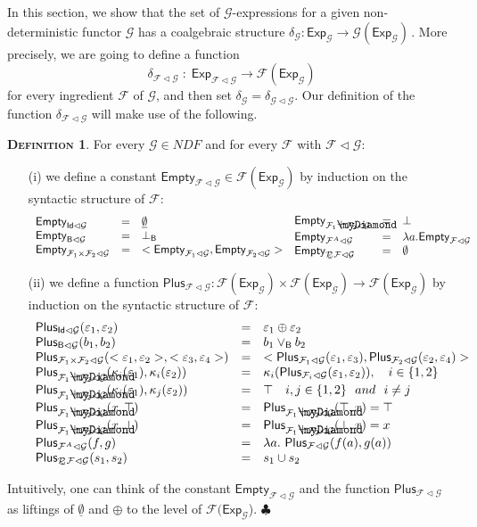 \documentclass{LMCS}
\def\pow{{\mathcal P_{\!\!\!\omega}}}
\newcommand\E\varepsilon
\newcommand\Exp{\mathsf{Exp}}
\newcommand\Plus{\mathsf{Plus}}
\newcommand\Empty{\mathsf{Empty}}
\newcommand\ndf{\mathit{NDF}}
\newcommand\id{\mathsf{Id}}
\newcommand\B{\mathsf{B}}
\newcommand\G{\mathcal{G}}
\newcommand\F{\mathcal{F}}
\newcommand\emp{\underline\emptyset}
\newcommand{\myplus}{\mathbin{\rlap{$\myDiamond$}\hspace*{.01cm}\raisebox{.14ex}{$+$}}}
\def\hyph{-\penalty0\hskip0pt\relax}
\theoremstyle{definition}
\newtheorem{mydefinition}{\textsc{Definition}}[section]
\theoremstyle{plain}
\theoremstyle{plain}
\theoremstyle{plain}
\theoremstyle{plain}
\theoremstyle{definition}
\theoremstyle{definition}
\newenvironment{definition}{
\begin{mydefinition}}
    {\hfill$\clubsuit$\end{mydefinition}}
\begin{document}
In this section, we show that the set of $\G$-expressions for a given
non\hyph deterministic functor $\G$ has a coalgebraic structure
$\delta_\G \colon
\Exp_\G\to \G(\Exp_\G)\,$. More precisely, we
are going to define a function
\[
\delta_{\F \lhd \G}\; : \; \Exp_{\F\lhd \G} \to \F (\Exp_\G)
\]
for every ingredient $\F$ of $\G$, and then set $\delta_\G =
\delta_{\G\lhd \G}$. Our definition of the
function $\delta_{\F \lhd \G}$ will make use of the following.
\begin{definition}For every $\G\in \ndf$ and for every $\F$ with
$\F\lhd \G$:
\begin{itemize} 
\item[(i)] we define a constant $\Empty_{\F\lhd \G} \in
\F(\Exp_{\G})$ by induction on the syntactic structure of $\F$:
\[
\begin{array}{lcl}
\Empty_{\id\lhd \G} &=& \emp \\
\Empty_{\B\lhd \G} &=& \bot_\B\\
\Empty_{\F_1\times \F_2\lhd \G} &=& <\Empty_{\F_1\lhd
\G}, \Empty_{\F_2\lhd \G}>
\end{array}
\begin{array}{lcl}
\Empty_{\F_1\myplus \F_2\lhd \G} &=& \bot\\
\Empty_{\F^A\lhd \G} &=& \lambda a. \Empty_{\F\lhd \G}\\
\Empty_{\pow \F\lhd \G} &=& \emptyset
\end{array}
\]
\item[(ii)] we define  a function $\Plus_{\F\lhd \G}\colon
\F(\Exp_{\G})\times
\F(\Exp_{\G})\to
\F(\Exp_\G)$ by induction on the syntactic structure of $\F$:
\[
\begin{array}{lcl}
\Plus_{\id\lhd \G} (\E_1, \E_2) &=& \E_1 \oplus \E_2\\
\Plus_{\B\lhd \G} (b_1,b_2) &=& b_1\vee_\B b_2\\
\Plus_{\F_1\times \F_2 \lhd \G} (<\E_1, \E_2>, <\E_3,
\E_4>)& =& <\Plus_{\F_1\lhd \G} (\E_1,\E_3),
\Plus_{\F_2\lhd \G} (
\E_2, \E_4)>\\
\Plus_{\F_1 \myplus \F_2\lhd \G} (\kappa_i(\E_1),\kappa_i(\E_2)) &=&
\kappa_i(\Plus_{\F_i\lhd \G} (\E_1,\E_2)),\ \ \ i\in \{1,2\}\\
\Plus_{\F_1 \myplus \F_2\lhd \G} (\kappa_i(\E_1),\kappa_j(\E_2)) &=& \top
\ \ \ i,j\in\{1,2\}\ \ and\ \ i\neq j\\
\Plus_{\F_1 \myplus \F_2\lhd \G} (x,\top) &=& \Plus_{\F_1
\myplus \F_2\lhd \G}
(\top,x) = \top\\
\Plus_{\F_1 \myplus \F_2\lhd \G} (x,\bot) &=& \Plus_{\F_1
\myplus \F_2\lhd \G}
(\bot,x) = x\\
\Plus_{\F^A\lhd \G}(f,g)& =& \lambda a.\ \Plus_{\F\lhd
\G}(f(a),g(a))\\
\Plus_{\pow \F\lhd \G}(s_1,s_2)&=& s_1\cup s_2
\end{array}
\]
\end{itemize}
Intuitively, one can think of the constant $\Empty_{\F \lhd \G}$
and the function $\Plus_{\F\lhd \G}$ as liftings of $\emp$
and $\oplus$ to the level of $\F(\Exp_{\G}$).
\end{definition}
\end{document}
